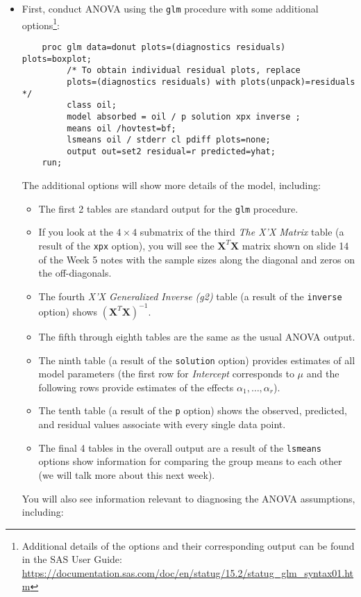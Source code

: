 \documentclass[11pt]{article}
\begin{document}
\begin{itemize}
	\item First, conduct ANOVA using the \texttt{glm} procedure with some additional options\footnote{Additional details of the options and their corresponding output can be found in the SAS User Guide: \\\url{https://documentation.sas.com/doc/en/statug/15.2/statug_glm_syntax01.htm}}:
	\begin{verbatim}
	proc glm data=donut plots=(diagnostics residuals) plots=boxplot;
	     /* To obtain individual residual plots, replace 
	     plots=(diagnostics residuals) with plots(unpack)=residuals */
	     class oil;
	     model absorbed = oil / p solution xpx inverse ;
	     means oil /hovtest=bf;
	     lsmeans oil / stderr cl pdiff plots=none;
	     output out=set2 residual=r predicted=yhat;
	run;
	\end{verbatim}
	The additional options will show more details of the model, including:
	\begin{itemize}
		\item The first 2 tables are standard output for the \texttt{glm} procedure.
		\item If you look at the $4\times 4$ submatrix of the third \textit{The X'X Matrix} table (a result of the \texttt{xpx} option), you will see the $\mathbf X^T \mathbf X$ matrix shown on slide 14 of the Week 5 notes with the sample sizes along the diagonal and zeros on the off-diagonals.
		\item The fourth \textit{X'X Generalized Inverse (g2)} table (a result of the \texttt{inverse} option) shows $(\mathbf X^T \mathbf X)^{-1}$.
		\item The fifth through eighth tables are the same as the usual ANOVA output.
		\item The ninth table (a result of the \texttt{solution} option) provides estimates of all model parameters (the first row for \textit{Intercept} corresponds to $\mu$ and the following rows provide estimates of the effects $\alpha_1, \ldots, \alpha_r$).
		\item The tenth table (a result of the \texttt{p} option) shows the observed, predicted, and residual values associate with every single data point.
		\item The final 4 tables in the overall output are a result of the \texttt{lsmeans} options show information for comparing the group means to each other (we will talk more about this next week).
	\end{itemize}
	You will also see information relevant to diagnosing the ANOVA assumptions, including:

\end{itemize}
\end{document}
